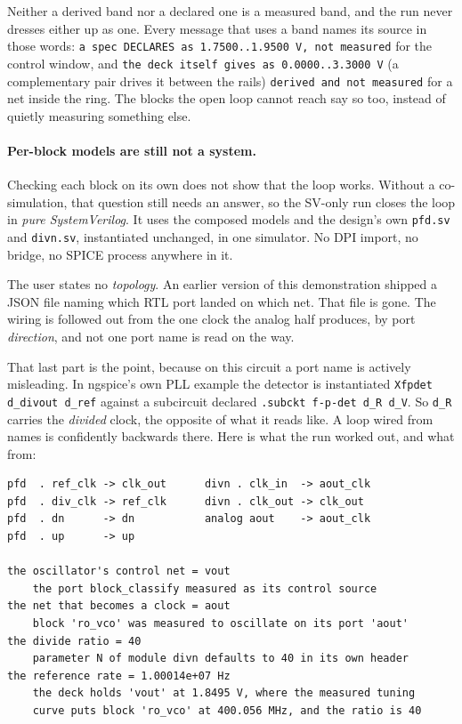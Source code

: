 \documentclass[11pt,a4paper]{article}
\begin{document}
\noindent Neither a derived band nor a declared one is a measured
band, and the run never dresses either up as one. Every message that
uses a band names its source in those words: \texttt{a spec DECLARES
as 1.7500..1.9500 V, not measured} for the control window, and
\texttt{the deck itself gives as 0.0000..3.3000 V} (a complementary
pair drives it between the rails) \texttt{derived and not measured}
for a net inside the ring. The blocks the open loop cannot reach say
so too, instead of quietly measuring something else.

\paragraph{Per-block models are still not a system.} Checking each
block on its own does not show that the loop works. Without a
co-simulation, that question still needs an answer, so the SV-only run
closes the loop in \emph{pure SystemVerilog}. It uses the composed
models and the design's own \texttt{pfd.sv} and \texttt{divn.sv},
instantiated unchanged, in one simulator. No DPI import, no bridge, no
SPICE process anywhere in it.

The user states no \emph{topology}. An earlier version of this
demonstration shipped a JSON file naming which RTL port landed on
which net. That file is gone. The wiring is followed out from the one
clock the analog half produces, by port \emph{direction}, and not one
port name is read on the way.

That last part is the point, because on this circuit a port name is
actively misleading. In ngspice's own PLL example the detector is
instantiated \texttt{Xfpdet d\_divout d\_ref} against a subcircuit
declared \texttt{.subckt f-p-det d\_R d\_V}. So \texttt{d\_R} carries
the \emph{divided} clock, the opposite of what it reads like. A loop
wired from names is confidently backwards there. Here is what the run
worked out, and what from:

\begin{lstlisting}
pfd  . ref_clk -> clk_out      divn . clk_in  -> aout_clk
pfd  . div_clk -> ref_clk      divn . clk_out -> clk_out
pfd  . dn      -> dn           analog aout    -> aout_clk
pfd  . up      -> up

the oscillator's control net = vout
    the port block_classify measured as its control source
the net that becomes a clock = aout
    block 'ro_vco' was measured to oscillate on its port 'aout'
the divide ratio = 40
    parameter N of module divn defaults to 40 in its own header
the reference rate = 1.00014e+07 Hz
    the deck holds 'vout' at 1.8495 V, where the measured tuning
    curve puts block 'ro_vco' at 400.056 MHz, and the ratio is 40
\end{lstlisting}
\end{document}
